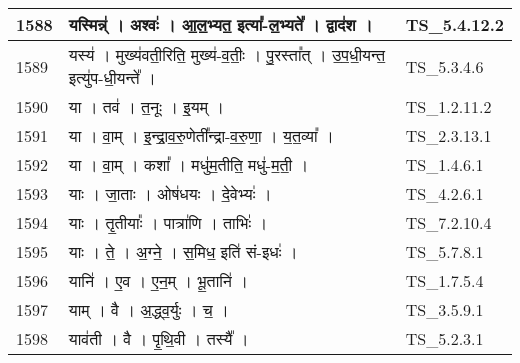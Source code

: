 \documentclass[17pt]{extarticle}
\begin{document}
\begin{longtable}{||p{0.4in}||p{4.9in}||p{0.9in}||}
    \hline
        
    1588 & यस्मिन्न्॑   ।   अश्वः॑   ।   आ॒ल॒भ्यत॒ इत्या᳚{-}ल॒भ्यते᳚   ।   द्वाद॑श   ।    & TS\_5.4.12.2       \\
    
    \hline
        
    1589 & यस्य॑   ।   मुख्य॑वती॒रिति॒ मुख्य॑{-}व॒तीः॒   ।   पु॒रस्ता᳚त्   ।   उ॒प॒धी॒यन्त॒ इत्यु॑प{-}धी॒यन्ते᳚   ।    & TS\_5.3.4.6       \\
    
    \hline
        
    1590 & या   ।   तव॑   ।   त॒नूः   ।   इ॒यम्   ।    & TS\_1.2.11.2       \\
    
    \hline
        
    1591 & या   ।   वा॒म्   ।   इ॒न्द्रा॒व॒रु॒णेती᳚न्द्रा{-}व॒रु॒णा॒   ।   य॒त॒व्या᳚   ।    & TS\_2.3.13.1       \\
    
    \hline
        
    1592 & या   ।   वा॒म्   ।   कशा᳚   ।   मधु॑म॒तीति॒ मधु॑{-}म॒ती॒   ।    & TS\_1.4.6.1       \\
    
    \hline
        
    1593 & याः   ।   जा॒ताः   ।   ओष॑धयः   ।   दे॒वेभ्यः॑   ।    & TS\_4.2.6.1       \\
    
    \hline
        
    1594 & याः   ।   तृ॒तीयाः᳚   ।   पात्रा॑णि   ।   ताभिः॑   ।    & TS\_7.2.10.4       \\
    
    \hline
        
    1595 & याः   ।   ते॒   ।   अ॒ग्ने॒   ।   स॒मिध॒ इति॑ सं{-}इधः॑   ।    & TS\_5.7.8.1       \\
    
    \hline
        
    1596 & यानि॑   ।   ए॒व   ।   ए॒न॒म्   ।   भू॒तानि॑   ।    & TS\_1.7.5.4       \\
    
    \hline
        
    1597 & याम्   ।   वै   ।   अ॒द्ध्व॒र्युः   ।   च॒   ।    & TS\_3.5.9.1       \\
    
    \hline
        
    1598 & याव॑ती   ।   वै   ।   पृ॒थि॒वी   ।   तस्यै᳚   ।    & TS\_5.2.3.1       \\
    

\end{longtable}
\end{document}
